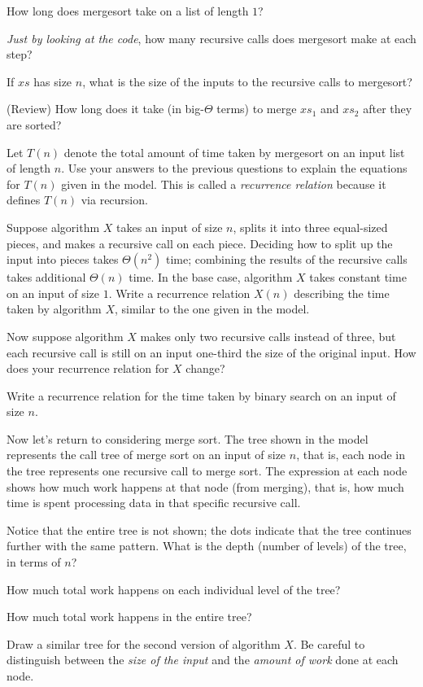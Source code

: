\documentclass{tufte-handout}
\begin{document}
\begin{questions}
  \item How long does \textsf{mergesort} take on a list of length $1$?
  \item \emph{Just by looking at the code}, how many recursive calls does
  \textsf{mergesort} make at each step?
  \item If $xs$ has size $n$, what is the size of the inputs to the
    recursive calls to \textsf{mergesort}?
  \item (Review) How long does it take (in big-$\Theta$ terms) to
    merge $xs_1$ and $xs_2$ after they are sorted?
  \item Let $T(n)$ denote the total amount of time taken by
    \textsf{mergesort} on an input list of length $n$.  Use your
    answers to the previous questions to explain the equations for
    $T(n)$ given in the model.  This is called a \emph{recurrence
      relation} because it defines $T(n)$ via recursion.
  \item Suppose algorithm $X$ takes an input of size $n$, splits it
    into three equal-sized pieces, and makes a recursive call on each
    piece.  Deciding how to split up the input into pieces takes
    $\Theta(n^2)$ time; combining the results of the recursive calls
    takes additional $\Theta(n)$ time.  In the base case, algorithm
    $X$ takes constant time on an input of size $1$. Write a
    recurrence relation $X(n)$ describing the time taken by algorithm
    $X$, similar to the one given in the model.
  \item Now suppose algorithm $X$ makes only two recursive calls instead
    of three, but each recursive call is still on an input one-third
    the size of the original input.  How does your recurrence relation
    for $X$ change?
  \item Write a recurrence relation for the time taken by binary
    search on an input of size $n$.
\end{questions}

\newpage
Now let's return to considering merge sort.  The tree shown in
the model represents the call tree of merge sort on an input of
size $n$, that is, each node in the tree represents one recursive call
to merge sort.  The expression at each node shows how much work
happens at that node (from merging), that is, how much time is spent
processing data in that specific recursive call.

\begin{questions}
  \item Notice that the entire tree is not shown; the dots indicate
    that the tree continues further with the same pattern.  What is
    the depth (number of levels) of the tree, in terms of $n$?
  \item How much total work happens on each individual level of the tree?
  \item How much total work happens in the entire tree?
  \item Draw a similar tree for the second version of algorithm
    $X$. Be careful to distinguish between the \emph{size of the
      input} and the \emph{amount of work} done at each node.
\end{questions}
\end{document}
